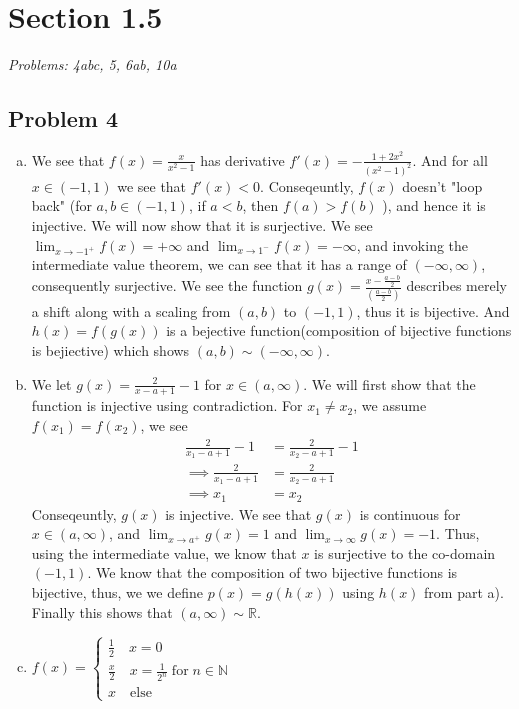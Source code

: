 \documentclass[12pt]{article}
\begin{document}

\section*{Section 1.5}
\textit{Problems: 4abc, 5, 6ab, 10a}
\subsection*{Problem 4}
\begin{enumerate}[a).]
    \item {
We see that $f(x) = \frac{x}{x^2 - 1}$ has derivative $f'(x) = - \frac{1 + 2x^2}{(x^2 - 1)^2}$.
And for all $x \in (-1, 1)$ we see that $f'(x) < 0$. 
Conseqeuntly, $f(x)$ doesn't "loop back" (for $a,b \in (-1,1)$, if $a < b$, then $f(a) > f(b)$ ), and hence it is injective. 
We will now show that it is surjective. 
We see $\lim_{x \rightarrow -1^+}f(x) = + \infty$ and $\lim_{x \rightarrow 1^-}f(x) = - \infty$, and invoking the intermediate value theorem, we can see that it has a range of $(- \infty, \infty)$, consequently surjective. 
We see the function $g(x) = \frac{x - \frac{a - b}{2}}{(\frac{a-b}{2})}$ describes merely a shift along with a scaling from $(a,b)$ to $(-1,1)$, thus it is bijective.
And $h(x) = f(g(x))$ is a bejective function(composition of bijective functions is bejiective) which shows $(a,b) \sim (- \infty, \infty)$. 
    }
    \item {
        We let $g(x) = \frac{2}{x-a + 1} - 1$ for $x \in (a, \infty)$. 
        We will first show that the function is injective using contradiction. 
        For $x_1 \ne x_2$, we assume $f(x_1) = f(x_2)$, we see
        \begin{align*}
            \frac{2}{x_1-a + 1} - 1 &= \frac{2}{x_2-a + 1} - 1 \\
            \implies \frac{2}{x_1-a + 1} &= \frac{2}{x_2-a + 1} \\
            \implies x_1 &= x_2
        \end{align*}
        Conseqeuntly, $g(x)$ is injective. 
        We see that $g(x)$ is continuous for $x \in (a, \infty)$, and $\lim_{x \rightarrow a^+}g(x) = 1$ and $\lim_{x \rightarrow \infty}g(x) = -1$. 
        Thus, using the intermediate value, we know that $x$ is surjective to the co-domain $(-1,1)$. 
        We know that the composition of two bijective functions is bijective, thus, we we define $p(x) = g(h(x))$ using $h(x)$ from part a). 
        Finally this shows that $(a, \infty) \sim \mathbb{R}$. 
    }
    \item {
        $ 
        f(x) = \left\{ 
            \begin{array}{ll} 
                \frac{1}{2} \quad x = 0 \\
                \frac{x}{2} \quad x = \frac{1}{2^n} \; \text{for} \; n \in \mathbb{N} \\
                x \quad \text{else} 
            \end{array} \right.
        $

}
\end{enumerate}
\end{document}
